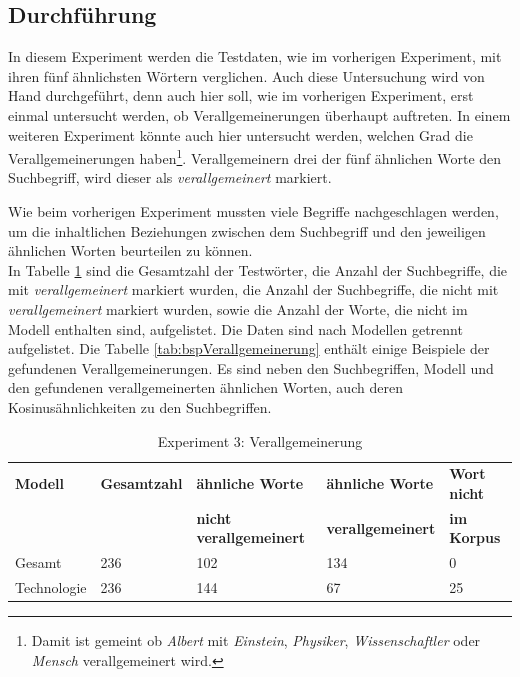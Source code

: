\documentclass[12pt,a4paper]{report}
\begin{document}
		\subsection*{Durchführung}
		In diesem Experiment werden die Testdaten, wie im vorherigen Experiment, mit ihren fünf ähnlichsten Wörtern verglichen. Auch diese Untersuchung wird von Hand durchgeführt, denn auch hier soll, wie im vorherigen Experiment, erst einmal untersucht werden, ob Verallgemeinerungen überhaupt auftreten. In einem weiteren Experiment könnte auch hier untersucht werden, welchen Grad die Verallgemeinerungen haben\footnote{Damit ist gemeint ob \textit{Albert} mit \textit{Einstein}, \textit{Physiker}, \textit{Wissenschaftler} oder \textit{Mensch} verallgemeinert wird.}. Verallgemeinern drei der fünf ähnlichen Worte den Suchbegriff, wird dieser als \textit{verallgemeinert} markiert. 
		
		
		Wie beim vorherigen Experiment mussten viele Begriffe nachgeschlagen werden,  um die inhaltlichen Beziehungen zwischen dem Suchbegriff und den jeweiligen ähnlichen Worten beurteilen zu können.\\
		
In Tabelle \ref{tab:Experiment3} sind die Gesamtzahl der Testwörter, die Anzahl der Suchbegriffe, die mit \textit{verallgemeinert} markiert wurden, die Anzahl der Suchbegriffe,  die nicht mit \textit{verallgemeinert} markiert wurden, sowie die Anzahl der Worte, die nicht im Modell enthalten sind, aufgelistet. Die Daten sind nach Modellen getrennt aufgelistet. Die Tabelle \ref{tab:bspVerallgemeinerung} enthält einige Beispiele der gefundenen Verallgemeinerungen. Es sind neben den Suchbegriffen, Modell und den gefundenen verallgemeinerten ähnlichen Worten, auch deren Kosinusähnlichkeiten zu den Suchbegriffen.
		
\begin{table}[H]
\caption{Experiment 3: Verallgemeinerung}
\label{tab:Experiment3}
\begin{center}
\begin{tabular}{|l||l|l|l|l|}
\hline
\textbf{Modell} & \textbf{Gesamtzahl}& \textbf{ähnliche Worte} & \textbf{ähnliche Worte}  & \textbf{Wort nicht} \\
 &  & \textbf{nicht verallgemeinert} & \textbf{verallgemeinert} &\textbf{ im Korpus} \\

\hline
 Gesamt & 236 & 102 & 134 & 0  \\
 \hline
 Technologie & 236 & 144 & 67 & 25 \\
 \hline
 
\end{tabular}
\end{center}
\end{table}
\end{document}
